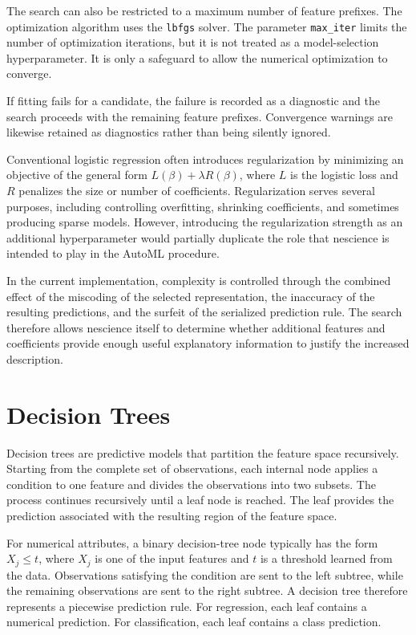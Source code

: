 The search can also be restricted to a maximum number of feature prefixes. The optimization algorithm uses the \texttt{lbfgs} solver. The parameter \texttt{max\_iter} limits the number of optimization iterations, but it is not treated as a model-selection hyperparameter. It is only a safeguard to allow the numerical optimization to converge.

If fitting fails for a candidate, the failure is recorded as a diagnostic and the search proceeds with the remaining feature prefixes. Convergence warnings are likewise retained as diagnostics rather than being silently ignored.

Conventional logistic regression often introduces regularization by minimizing an objective of the general form $L(\beta) + \lambda R(\beta)$, where $L$ is the logistic loss and $R$ penalizes the size or number of
coefficients. Regularization serves several purposes, including controlling overfitting, shrinking coefficients, and sometimes producing sparse models. However, introducing the regularization strength as an additional hyperparameter would partially duplicate the role that nescience is intended to play in the AutoML
procedure.

In the current implementation, complexity is controlled through the combined effect of the miscoding of the selected representation, the inaccuracy of the resulting predictions, and the surfeit of the serialized prediction rule. The search therefore allows nescience itself to determine whether additional features and coefficients provide enough useful explanatory information to justify the increased description.

%
%

\section{Decision Trees}
\label{subsec:automl_decision_trees}

Decision trees are predictive models that partition the feature space recursively. Starting from the complete set of observations, each internal node applies a condition to one feature and divides the observations into two subsets. The process continues recursively until a leaf node is reached. The leaf provides the prediction associated with the resulting region of the feature space.

For numerical attributes, a binary decision-tree node typically has the form $X_j \leq t$, where $X_j$ is one of the input features and \(t\) is a threshold learned from the data. Observations satisfying the condition are sent to the left subtree, while the remaining observations are sent to the right subtree. A decision tree therefore represents a piecewise prediction rule. For regression, each leaf contains a numerical prediction. For classification, each leaf contains a class prediction.

